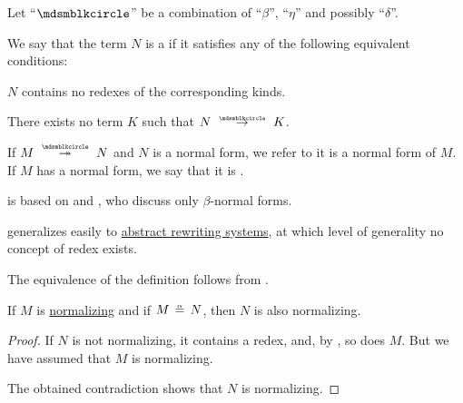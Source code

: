 \begin{definition}\label{def:lambda_reduction_normal_form}\mimprovised
  Let \enquote{\( {\Anon} \)} be a combination of \enquote{\( \beta \)}, \enquote{\( \eta \)} and possibly \enquote{\( \delta \)}.

  We say that the term \( N \) is a  if it satisfies any of the following equivalent conditions:
  \begin{thmenum}
     \( N \) contains no redexes of the corresponding kinds.

     There exists no term \( K \) such that \( N \pred K \).
  \end{thmenum}

  If \( M \pred* N \) and \( N \) is a normal form, we refer to it is a normal form of \( M \). If \( M \) has a normal form, we say that it is .
\end{definition}
\begin{comments}
  \item {} is based on  and , who discuss only \( \beta \)-normal forms.

  \item {} generalizes easily to \hyperref[def:rewriting_system]{abstract rewriting systems}, at which level of generality no concept of redex exists.
\end{comments}
\begin{defproof}
  The equivalence of the definition follows from .
\end{defproof}

\begin{proposition}\label{thm:strong_normalization_of_alpha_equivalent_term}
  If \( M \) is \hyperref[def:lambda_term_normal_form]{normalizing} and if \( M \aequiv N \), then \( N \) is also normalizing.
\end{proposition}
\begin{proof}
  If \( N \) is not normalizing, it contains a redex, and, by , so does \( M \). But we have assumed that \( M \) is normalizing.

  The obtained contradiction shows that \( N \) is normalizing.
\end{proof}

